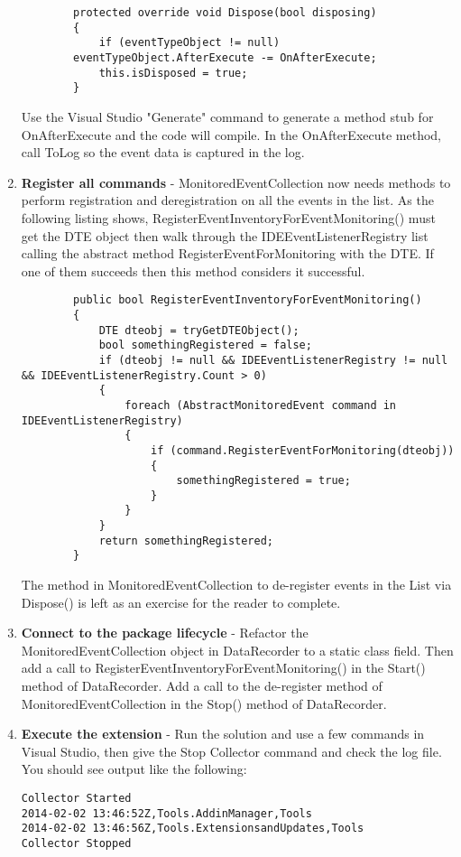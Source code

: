 \begin{enumerate}
\begin{lstlisting}
        protected override void Dispose(bool disposing)
        {
            if (eventTypeObject != null) 
		eventTypeObject.AfterExecute -= OnAfterExecute;
            this.isDisposed = true;
        }
\end{lstlisting}

Use the Visual Studio "Generate" command to generate a method stub for OnAfterExecute and the
code will compile.  In the OnAfterExecute method, call ToLog so the event data is captured in the log.

\item {\bf Register all commands} -  
MonitoredEventCollection now needs methods to perform registration and deregistration on all the events in the list.  As the following listing shows, RegisterEventInventoryForEventMonitoring() must get the DTE object then walk through the IDEEventListenerRegistry list calling the abstract method RegisterEventForMonitoring with the DTE.  If one of them succeeds then this method considers it successful.

\begin{lstlisting}
        public bool RegisterEventInventoryForEventMonitoring()
        {
            DTE dteobj = tryGetDTEObject();
            bool somethingRegistered = false;
            if (dteobj != null && IDEEventListenerRegistry != null && IDEEventListenerRegistry.Count > 0)
            {
                foreach (AbstractMonitoredEvent command in IDEEventListenerRegistry)
                {
                    if (command.RegisterEventForMonitoring(dteobj))
                    {
                        somethingRegistered = true;
                    }
                }
            }
            return somethingRegistered;
        }
\end{lstlisting}

The method in MonitoredEventCollection to de-register events in the List via Dispose() is left as an exercise for the reader to complete.

\item {\bf Connect to the package lifecycle} - 
Refactor the MonitoredEventCollection object in DataRecorder to a static class field.  Then add a call to RegisterEventInventoryForEventMonitoring() in the Start() method of DataRecorder.  Add a call to the de-register method of MonitoredEventCollection in the Stop() method of DataRecorder.  

\item {\bf Execute the extension} - 
Run the solution and use a few commands in Visual Studio, then give the Stop Collector command and check the log file.  You should see output like the following:
\begin{verbatim}
Collector Started
2014-02-02 13:46:52Z,Tools.AddinManager,Tools
2014-02-02 13:46:56Z,Tools.ExtensionsandUpdates,Tools
Collector Stopped
\end{verbatim}


\end{enumerate}


